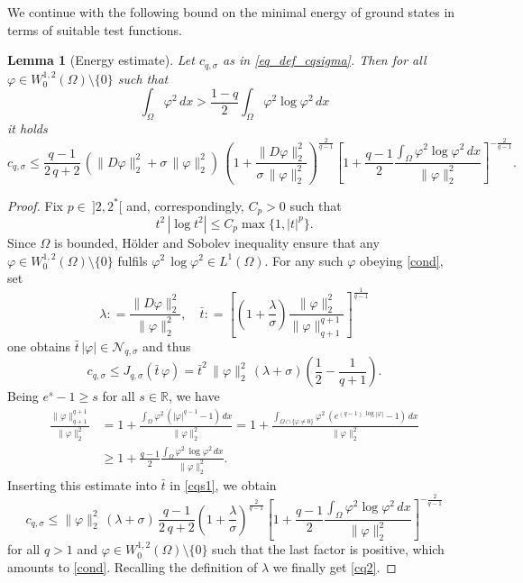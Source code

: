 \documentclass[12pt]{amsart}
\numberwithin{equation}{section}
\theoremstyle{plain}
\newtheorem{lemma}[theorem]{Lemma}
\theoremstyle{plain}
\theoremstyle{plain}
\theoremstyle{definition}
\newcommand{\R}{{\mathbb R}}
\newcommand{\beq}{\begin{equation}}
\newcommand{\eeq}{\end{equation}}
\renewcommand{\le}{\leqslant}
\renewcommand{\ge}{\geqslant}
\begin{document}
We continue with the following bound on the minimal energy of ground states in terms of suitable test functions.

\begin{lemma}[Energy estimate]
\label{lem_energ_estim}
Let $c_{q, \sigma}$ as in \eqref{eq_def_cqsigma}.
Then for all $\varphi\in W^{1,2}_0(\Omega)\setminus\{0\}$ such that
\beq
\label{cond}
 \int_\Omega\varphi^2\, dx> \frac{1-q}{2}\int_\Omega\varphi^2\log\varphi^2\, dx
 \eeq
 it holds
\beq
\label{cq2}
c_{q, \sigma}\le \frac{q-1}{2\, q+2}\, \left(\|D \varphi\|_2^2+\sigma\, \|\varphi\|_2^2\right)\, \left(1+\frac{\|D \varphi\|_2^2}{\sigma\, \|\varphi\|_2^2}\right)^{\frac{2}{q-1}}\left[1+\frac{q-1}{2}\frac{\displaystyle{\int_\Omega \varphi^2\log\varphi^2\, dx}}{\|\varphi\|_2^2}\right]^{-\frac{2}{q-1}}.
 \eeq
\end{lemma}

\begin{proof}
Fix $p\in \ ]2, 2^*[$ and, correspondingly, $C_p>0$ such that
\[
t^2\,|\log t^2|\le C_p\max \{1, |t|^{p}\}.
\]
 Since $\Omega$ is bounded, H\"older and Sobolev inequality ensure that any $\varphi\in W^{1,2}_0(\Omega)\setminus\{0\}$ fulfils $\varphi^2\,\log\varphi^2\in L^1(\Omega)$. 
For any such $\varphi$ obeying \eqref{cond}, set
\[
\lambda: =\frac{\|D \varphi\|_2^2}{\|\varphi\|_2^2}, \quad \bar t: =\left[\left(1+\frac{\lambda}{\sigma} \right)\frac{\|\varphi\|_2^2}{\|\varphi\|_{q+1}^{q+1}}\right]^{\frac{1}{q-1}}
\]
one obtains $\bar t\, |\varphi| \in {\mathcal N}_{q, \sigma}$ and thus
\beq
\label{cqs1}
c_{q, \sigma}\le J_{q, \sigma}(\bar t\, \varphi)=\bar t^2\, \|\varphi\|_2^2\, (\lambda+\sigma)\left(\frac{1}{2}-\frac{1}{q+1}\right). 
\eeq
Being $e^s-1\ge s$ for all $s\in \R$, we have
\[
\begin{split}
\frac{\|\varphi\|_{q+1}^{q+1}}{\|\varphi\|_2^{2}}&= 1+\frac{\displaystyle{\int_\Omega \varphi^2 \, (|\varphi|^{q-1}-1)\, dx}}{\|\varphi\|_2^2}=1+\frac{\displaystyle{\int_{\Omega\cap \{\varphi \neq 0\}} \varphi^2 \, (e^{(q-1)\, \log|\varphi| 
}-1)\, dx}}{\|\varphi\|_2^2}\\
&\ge 1+\frac{q-1}{2}\frac{\displaystyle{\int_\Omega \varphi^2 \, \log\varphi^2\, dx}}{\|\varphi\|_2^2}.
\end{split}
\]
Inserting this estimate into $\bar t$ in \eqref{cqs1}, we obtain
\[
 c_{q, \sigma}\le \|\varphi\|_2^2\, (\lambda+\sigma)\, \frac{q-1}{2\, q+2}\left(1+\frac{\lambda}{\sigma}\right)^{\frac{2}{q-1}}\left[1+\frac{q-1}{2}\frac{\displaystyle{\int_\Omega \varphi^2\log\varphi^2\, dx}}{\|\varphi\|_2^2}\right]^{-\frac{2}{q-1}}
\]
 for all $q>1$ and $\varphi\in W^{1,2}_0(\Omega)\setminus\{0\}$ such that the last factor is positive, which amounts to \eqref{cond}. Recalling the definition of $\lambda$ we finally get \eqref{cq2}.
 \end{proof}
\end{document}
